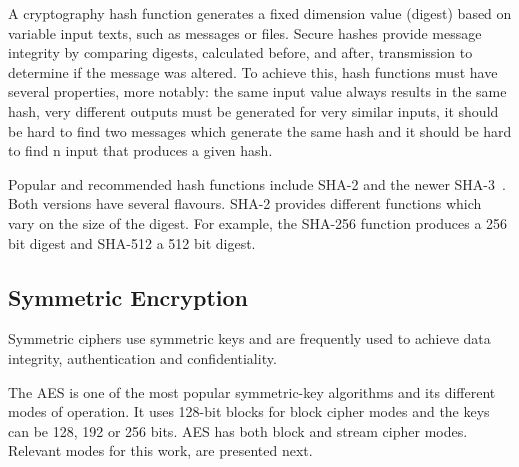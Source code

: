 A cryptography hash function generates a fixed dimension value (digest) based on variable input texts, such as messages or files. Secure hashes provide message integrity by comparing digests, calculated before, and after, transmission to determine if the message was altered.
To achieve this, hash functions must have several properties, more notably: the same input value always results in the same hash, very different outputs must be generated for very similar inputs, it should be hard to find two messages which generate the same hash and it should be hard to find n input that produces a given hash.

Popular and recommended hash functions include \ac{SHA}-2 and the newer \ac{SHA}-3~\cite{dang2015secure}. Both versions have several flavours. \ac{SHA}-2 provides different functions which vary on the size of the digest. For example, the \ac{SHA}-256 function produces a 256 bit digest and \ac{SHA}-512 a 512 bit digest.

\subsection{Symmetric Encryption}\label{chap:background:crypto:symmetric}

Symmetric ciphers use symmetric keys and are frequently used to achieve data integrity, authentication and confidentiality.

The \ac{AES} is one of the most popular symmetric-key algorithms and its different modes of operation. It uses 128-bit blocks for block cipher modes and the keys can be 128, 192 or 256 bits. \ac{AES} has both block and stream cipher modes. Relevant modes for this work, are presented next.

